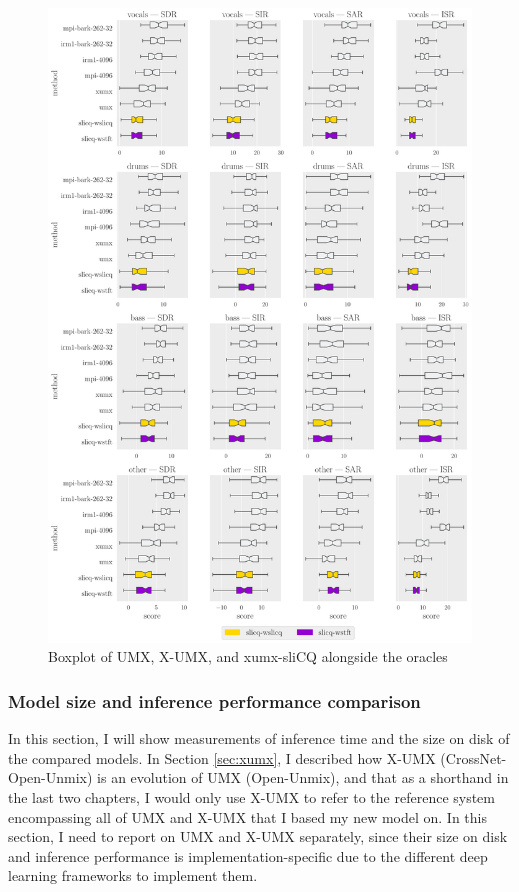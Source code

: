 \documentclass[report.tex]{subfiles}
\begin{document}
\begin{figure}[ht]
	\centering
	\includegraphics[width=\textwidth]{./images-bss/boxplot_full.pdf}
	\caption{Boxplot of UMX, X-UMX, and xumx-sliCQ alongside the oracles}
	\label{fig:bssboxplot}
\end{figure}

\newpagefill

\subsubsection{Model size and inference performance comparison}
\label{sec:inferenceperf}

In this section, I will show measurements of inference time and the size on disk of the compared models. In Section \ref{sec:xumx}, I described how X-UMX (CrossNet-Open-Unmix) is an evolution of UMX (Open-Unmix), and that as a shorthand in the last two chapters, I would only use X-UMX to refer to the reference system encompassing all of UMX and X-UMX that I based my new model on. In this section, I need to report on UMX and X-UMX separately, since their size on disk and inference performance is implementation-specific due to the different deep learning frameworks to implement them.
\end{document}
